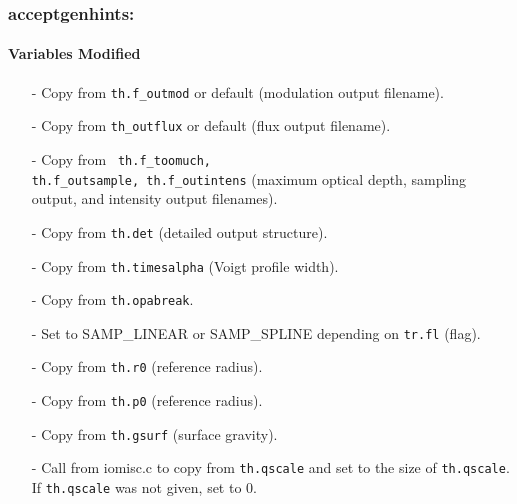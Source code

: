 \documentclass[letterpaper,12pt]{article}
\begin{document}
\subsubsection{acceptgenhints:}
\paragraph{Variables Modified}
\begin{enumerate}[leftmargin=10pt, noitemsep, parsep=0pt, topsep=0ex]
\item[-] Copy  from {\tt th.f\_outmod} or default (modulation
  output filename).
\item[-] Copy  from {\tt th\_outflux} or default (flux output filename).
\item[-] Copy  from {\tt
    th.f\_toomuch, \\ th.f\_outsample, th.f\_outintens} (maximum optical depth,
  sampling output, and intensity output filenames).
\item[-] Copy  from {\tt th.det} (detailed output structure).
\item[-] Copy  from {\tt th.timesalpha} (Voigt profile width).
\item[-] Copy  from {\tt th.opabreak}.
\item[-] Set  to SAMP\_LINEAR or SAMP\_SPLINE depending on {\tt tr.fl} (flag).
\item[-] Copy  from {\tt th.r0} (reference radius).
\item[-] Copy  from {\tt th.p0} (reference radius).
\item[-] Copy  from {\tt th.gsurf} (surface gravity).
\item[-] Call  from iomisc.c to copy   from {\tt th.qscale} and set  to the size of {\tt th.qscale}. If {\tt th.qscale} was not given, set  to 0.
\end{enumerate}
\end{document}
